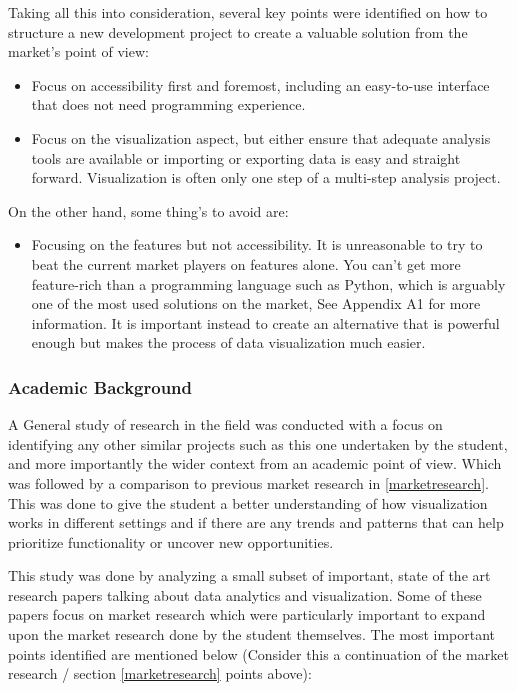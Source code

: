 Taking all this into consideration, several key points were identified on how to structure a new development project to create a valuable solution from the market’s point of view:

\begin{itemize}
    \item Focus on accessibility first and foremost, including an easy-to-use interface that does not need programming experience.
    \item Focus on the visualization aspect, but either ensure that adequate analysis tools are available or importing or exporting data is easy and straight forward. Visualization is often only one step of a multi-step analysis project.
\end{itemize}

On the other hand, some thing’s to avoid are:

\begin{itemize}
    \item Focusing on the features but not accessibility. It is unreasonable to try to beat the current market players on features alone. You can’t get more feature-rich than a programming language such as Python, which is arguably one of the most used solutions on the market, See Appendix A1 for more information. It is important instead to create an alternative that is powerful enough but makes the process of data visualization much easier.
\end{itemize}

\subsubsection{Academic Background} \label{academicbackground}
A General study of research in the field was conducted with a focus on identifying any other similar projects such as this one undertaken by the student, and more importantly the wider context from an academic point of view. Which was followed by a comparison to previous market research in \ref{marketresearch}. This was done to give the student a better understanding of how visualization works in different settings and if there are any trends and patterns that can help prioritize functionality or uncover new opportunities.

This study was done by analyzing a small subset of important, state of the art research papers talking about data analytics and visualization. Some of these papers focus on market research which were particularly important to expand upon the market research done by the student themselves. The most important points identified are mentioned below (Consider this a continuation of the market research / section \ref{marketresearch} points above):

